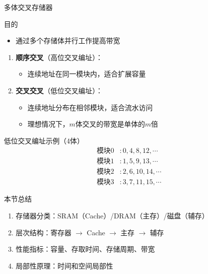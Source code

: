 \documentclass[10pt, aspectratio=169]{beamer}
\begin{document}
\begin{frame}{多体交叉存储器}
    \begin{block}{目的}
        \begin{itemize}
            \item 通过多个存储体并行工作提高带宽
        \end{itemize}
    \end{block}
    \vspace{0.3em}
    \begin{enumerate}
        \item \textbf{顺序交叉}（高位交叉编址）：
        \begin{itemize}
            \item 连续地址在同一模块内，适合扩展容量
        \end{itemize}
        \item \textbf{交叉交叉}（低位交叉编址）：
        \begin{itemize}
            \item 连续地址分布在相邻模块，适合流水访问
            \item 理想情况下，$m$体交叉的带宽是单体的$m$倍
        \end{itemize}
    \end{enumerate}
    \vspace{0.3em}
    \begin{exampleblock}{低位交叉编址示例（4体）}
        \begin{align*}
            \text{模块0} &: 0, 4, 8, 12, \cdots \\
            \text{模块1} &: 1, 5, 9, 13, \cdots \\
            \text{模块2} &: 2, 6, 10, 14, \cdots \\
            \text{模块3} &: 3, 7, 11, 15, \cdots
        \end{align*}
    \end{exampleblock}
\end{frame}

\begin{frame}{本节总结}
    \begin{enumerate}
        \item 存储器分类：SRAM（Cache）/DRAM（主存）/磁盘（辅存）
        \item 层次结构：寄存器 $\to$ Cache $\to$ 主存 $\to$ 辅存
        \item 性能指标：容量、存取时间、存储周期、带宽
        \item 局部性原理：时间和空间局部性
    \end{enumerate}
\end{frame}
\end{document}
